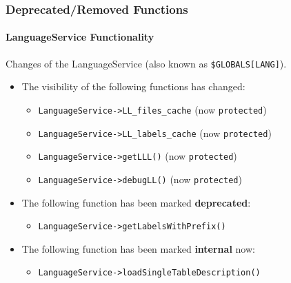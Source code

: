 \begin{frame}[fragile]
	\frametitle{Deprecated/Removed Functions}
	\framesubtitle{LanguageService Functionality}

	Changes of the LanguageService (also known as \texttt{\$GLOBALS[LANG]}).
	\vspace{0.4cm}
	\begin{itemize}
		\item The visibility of the following functions has changed:
			\begin{itemize}\smaller
				\item \texttt{LanguageService->LL\_files\_cache} (now \texttt{protected})
				\item \texttt{LanguageService->LL\_labels\_cache} (now \texttt{protected})
				\item \texttt{LanguageService->getLLL()} (now \texttt{protected})
				\item \texttt{LanguageService->debugLL()} (now \texttt{protected})
			\end{itemize}\normalsize
			\vspace{0.2cm}

		\item The following function has been marked \textbf{deprecated}:
			\begin{itemize}\smaller
				\item \texttt{LanguageService->getLabelsWithPrefix()}
			\end{itemize}\normalsize
			\vspace{0.2cm}

		\item The following function has been marked \textbf{internal} now:
			\begin{itemize}\smaller
				\item \texttt{LanguageService->loadSingleTableDescription()}
			\end{itemize}\normalsize
			\vspace{0.2cm}

	\end{itemize}

\end{frame}


